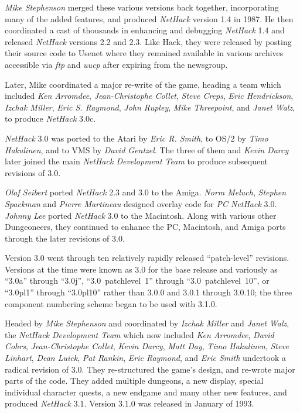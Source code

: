 \documentclass[titlepage]{article}
\begin{document}
\medskip
\noindent \textit{Mike Stephenson} merged these various versions back together,
incorporating many of the added features, and produced \textit{NetHack} version
1.4 in 1987.
He then coordinated a cast of thousands in enhancing and debugging
\textit{NetHack} 1.4 and released \textit{NetHack} versions 2.2 and 2.3.
Like Hack, they were released by posting their source code to Usenet where
they remained available in various archives accessible
via \textit{ftp} and \textit{uucp} after expiring from the newsgroup.

\medskip
\noindent Later, Mike coordinated a major re-write of the game, heading a team which
included \textit{Ken Arromdee}, \textit{Jean-Christophe Collet}, \textit{Steve Creps},
\textit{Eric Hendrickson}, \textit{Izchak Miller}, \textit{Eric S. Raymond}, \textit{John
Rupley}, \textit{Mike Threepoint}, and \textit{Janet Walz}, to produce
\textit{NetHack} 3.0c.

\medskip
\noindent \textit{NetHack} 3.0 was ported to the Atari by \textit{Eric R. Smith}, to OS/2 by
\textit{Timo Hakulinen}, and to VMS by \textit{David Gentzel}.  The three of them
and \textit{Kevin Darcy} later joined the main \textit{NetHack Development Team} to produce
subsequent revisions of 3.0.

\medskip
\noindent \textit{Olaf Seibert} ported \textit{NetHack} 2.3 and 3.0 to the Amiga.  {\it
Norm Meluch}, \textit{Stephen Spackman} and \textit{Pierre Martineau} designed
overlay code for \textit{PC NetHack} 3.0.  \textit{Johnny Lee} ported
\textit{NetHack} 3.0 to the Macintosh.  Along with various other Dungeoneers, they
continued to enhance the PC, Macintosh, and Amiga ports through the later
revisions of 3.0.

Version 3.0 went through ten relatively rapidly released ``patch-level''
revisions.
Versions at the time were known as 3.0 for the base release and variously
as ``3.0a'' through ``3.0j'',
``3.0~patchlevel~1'' through ``3.0~patchlevel~10'',
or ``3.0pl1'' through ``3.0pl10''
rather than 3.0.0 and 3.0.1 through 3.0.10;
the three component numbering scheme began to be used with 3.1.0.

\medskip
\noindent Headed by \textit{Mike Stephenson} and coordinated by \textit{Izchak Miller}
and \textit{Janet Walz}, the \textit{NetHack Development Team} which now included
\textit{Ken Arromdee},
\textit{David Cohrs}, \textit{Jean-Christophe Collet}, \textit{Kevin Darcy},
\textit{Matt Day}, \textit{Timo Hakulinen}, \textit{Steve Linhart}, \textit{Dean Luick},
\textit{Pat Rankin}, \textit{Eric Raymond}, and \textit{Eric Smith} undertook a
radical revision of 3.0.
They re-structured the game's design, and re-wrote major
parts of the code.
They added multiple dungeons, a new display, special
individual character quests, a new endgame and many other new features, and
produced \textit{NetHack} 3.1.
Version 3.1.0 was released in January of 1993.
\end{document}
